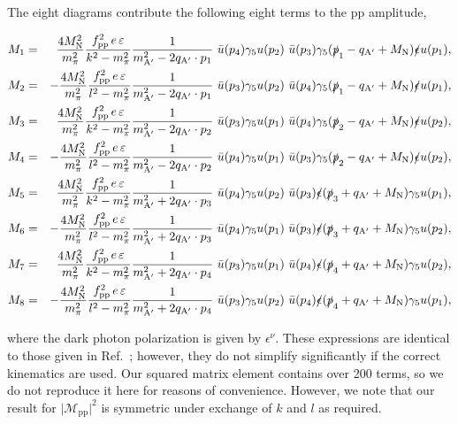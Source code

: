 \documentclass[nofootinbib,prd,superscriptaddress,twocolumn]{revtex4}
\newcommand{\qa}{q_{\mathrm{A}'}}
\newcommand{\Aprime}{\mathrm{A}'}
\begin{document}
The eight diagrams contribute the following eight terms to the pp amplitude, 
%
\begin{widetext}
\begin{eqnarray}
	M_1 &=& \frac{4 M_{\mathrm N}^2}{ m_\pi^2} \frac{f_{\mathrm{pp}}^2\, e\, \varepsilon}{k^2-m_\pi^2}  \frac{1}{m_{\mathrm{\Aprime}}^2 - 2 \qa \cdot p_1}\ 
	\bar{u}(p_4) \gamma_5 u(p_2)\  \bar{u}(p_3) \gamma_5 (\slashed{p}_1 - \qa +M_{\mathrm N})\slashed \epsilon  u(p_1), \\
	M_2 &=& -\frac{4 M_{\mathrm N}^2}{ m_\pi^2} \frac{f_{\mathrm{pp}}^2\, e\, \varepsilon}{l^2-m_\pi^2}  \frac{1}{m_{\mathrm{\Aprime}}^2 - 2 \qa \cdot p_1}\  
	\bar{u}(p_3) \gamma_5 u(p_2)\  \bar{u}(p_4) \gamma_5 (\slashed{p}_1 - \qa +M_{\mathrm N})\slashed{\epsilon} u(p_1),\\
	M_3 &=& \frac{4 M_{\mathrm N}^2}{ m_\pi^2} \frac{f_{\mathrm{pp}}^2\, e\, \varepsilon}{k^2-m_\pi^2}  \frac{1}{m_{\mathrm{\Aprime}}^2 - 2 \qa \cdot p_2}\ 
	\bar{u}(p_3) \gamma_5 u(p_1)\ \bar{u}(p_4) \gamma_5 (\slashed{p}_2 - \qa +M_{\mathrm N})\slashed \epsilon  u(p_2), \\
	M_4 &=& -\frac{4 M_{\mathrm N}^2}{ m_\pi^2} \frac{f_{\mathrm{pp}}^2\, e\, \varepsilon}{l^2-m_\pi^2}  \frac{1}{m_{\mathrm{\Aprime}}^2 - 2 \qa \cdot p_2}\ 
	\bar{u}(p_4) \gamma_5 u(p_1)\ \bar{u}(p_3) \gamma_5 (\slashed{p}_2 - \qa +M_{\mathrm N})\slashed \epsilon  u(p_2), \\
	M_5 &=& \frac{4 M_{\mathrm N}^2}{ m_\pi^2} \frac{f_{\mathrm{pp}}^2\, e\, \varepsilon}{k^2-m_\pi^2}  \frac{1}{m_{\mathrm{\Aprime}}^2 + 2 \qa \cdot p_3}\
	\bar{u}(p_4) \gamma_5 u(p_2)\ \bar{u}(p_3) \slashed{\epsilon} (\slashed{p}_3 + \qa +M_{\mathrm N})\gamma_5 u(p_1),\\
	M_6 &=& -\frac{4 M_{\mathrm N}^2}{ m_\pi^2} \frac{f_{\mathrm{pp}}^2\, e\, \varepsilon}{l^2-m_\pi^2}  \frac{1}{m_{\mathrm{\Aprime}}^2 + 2 \qa \cdot p_3}\ 
	\bar{u}(p_4) \gamma_5 u(p_1)\ \bar{u}(p_3) \slashed{\epsilon} (\slashed{p}_3 + \qa +M_{\mathrm N})\gamma_5 u(p_2),\\
	M_7 &=& \frac{4 M_{\mathrm N}^2}{ m_\pi^2} \frac{f_{\mathrm{pp}}^2\, e\, \varepsilon}{k^2-m_\pi^2}  \frac{1}{m_{\mathrm{\Aprime}}^2 + 2 \qa \cdot p_4}\ 
	\bar{u}(p_3) \gamma_5 u(p_1)\ \bar{u}(p_4) \slashed{\epsilon} (\slashed{p}_4 + \qa +M_{\mathrm N})\gamma_5 u(p_2),\\
	M_8 &=& -\frac{4 M_{\mathrm N}^2}{ m_\pi^2} \frac{f_{\mathrm{pp}}^2\, e\, \varepsilon}{l^2-m_\pi^2}  \frac{1}{m_{\mathrm{\Aprime}}^2 + 2 \qa \cdot p_4}\ 
	\bar{u}(p_3) \gamma_5 u(p_2)\ \bar{u}(p_4) \slashed{\epsilon} (\slashed{p}_4 + \qa +M_{\mathrm N})\gamma_5 u(p_1),
\end{eqnarray}
\end{widetext}
%
where the dark photon polarization is given by $\epsilon^{\nu}$. These expressions are identical to those 
given in Ref.~\cite{dent_etal12}; however, they do not simplify significantly if the correct kinematics are used. 
Our squared matrix element contains over 200 terms, so we do not reproduce it here for reasons of convenience. However, we note that our result for $\vert \mathcal{M}_{\mathrm{pp}} \vert^2$ is symmetric under exchange of $k$ and $l$ as required. 
\end{document}
